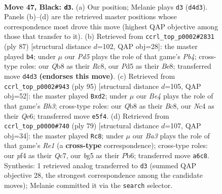 \documentclass[11pt]{article}
\begin{document}
\clearpage

\begin{figure}[p]\centering
\begin{subfigure}{0.46\textwidth}\centering
\resizebox{\linewidth}{!}{%
\newchessgame
\chessboard[
  setfen={1q6/r4k1p/b3p2Q/p2pbpB1/P1np1P1P/8/2R5/RN2N1K1 b - - 0 47},
  showmover=false,
  pgfstyle=straightmove, color=movearrow, markmove={d4-d3}
]}
\caption{}
\end{subfigure}\hfill
\begin{subfigure}{0.46\textwidth}\centering
\resizebox{\linewidth}{!}{%
\newchessgame
\chessboard[
  setfen={2rrb1k1/5p2/2n3pp/1p2p3/q3B1P1/b1R1P1NP/5P2/RQ2B1K1 b - - 1 44},
  showmover=false,
  pgfstyle=straightmove, color=movearrow, markmove={b5-b4}
]}
\caption{}
\end{subfigure}
\\[4pt]
\begin{subfigure}{0.46\textwidth}\centering
\resizebox{\linewidth}{!}{%
\newchessgame
\chessboard[
  setfen={2b5/2r4k/4q1pb/1p2p2p/1Pn1P3/2RB2P1/1B1NQP2/6K1 b - - 3 48},
  showmover=false,
  pgfstyle=straightmove, color=movearrow, markmove={h6-d2}
]}
\caption{}
\end{subfigure}\hfill
\begin{subfigure}{0.46\textwidth}\centering
\resizebox{\linewidth}{!}{%
\newchessgame
\chessboard[
  setfen={4r3/2qn1p1k/1pN1b1pp/8/P2Q1P2/4RB1P/6PK/8 b - - 9 40},
  showmover=false,
  pgfstyle=straightmove, color=movearrow, markmove={e8-c8}
]}
\caption{}
\end{subfigure}
\caption{\textbf{Move 47, Black: \texttt{d3}.} (a) Our position; Melanie plays \texttt{d3} (\texttt{d4d3}). Panels (b)--(d) are the retrieved master positions whose correspondence most drove this move (highest QAP objective among those that transfer to it). (b) Retrieved from \texttt{ccrl\_top\_p0002\#2831} (ply 87) [structural distance $d$=102, QAP obj=28]: the master played \texttt{b4}; under $\mu$ our \emph{Pd5} plays the role of that game's \emph{Pb4}; cross-type roles: our \emph{Q}b8 as their \emph{R}c8, our \emph{P}d5 as their \emph{B}e8; transferred move \texttt{d4d3} \textbf{(endorses this move)}. (c) Retrieved from \texttt{ccrl\_top\_p0002\#943} (ply 95) [structural distance $d$=105, QAP obj=52]: the master played \texttt{Bxd2}; under $\mu$ our \emph{Be4} plays the role of that game's \emph{Bh3}; cross-type roles: our \emph{Q}b8 as their \emph{B}c8, our \emph{N}c4 as their \emph{Q}e6; transferred move \texttt{e5f4}. (d) Retrieved from \texttt{ccrl\_top\_p0000\#740} (ply 79) [structural distance $d$=107, QAP obj=34]: the master played \texttt{Rc8}; under $\mu$ our \emph{Ba3} plays the role of that game's \emph{Re1} (a \textbf{cross-type} correspondence); cross-type roles: our \emph{p}f4 as their \emph{Q}c7, our \emph{b}g5 as their \emph{P}b6; transferred move \texttt{a6c8}. Synthesis: 1 retrieved analog transferred to \texttt{d3} (summed QAP objective 28, the strongest correspondence among the candidate moves); Melanie committed it via the \texttt{search} selector.}
\label{fig:thought-m93}
\end{figure}
\end{document}
